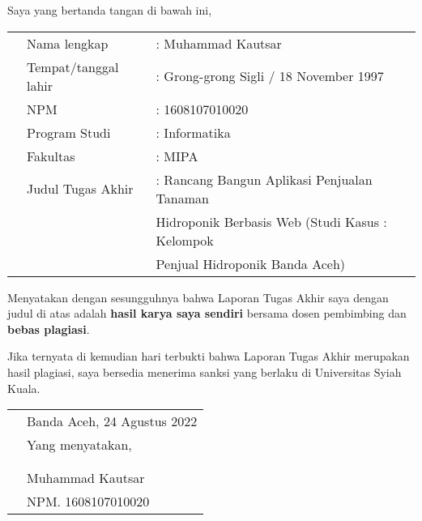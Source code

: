 \bplagiasi %

\noindent
Saya yang bertanda tangan di bawah ini,

\vspace{-0.1cm}

\begin{table}[H]
\begin{tabular}{m{0.6cm}ll}
	&Nama lengkap   		&: Muhammad Kautsar \\
	&Tempat/tanggal lahir	&: Grong-grong Sigli / 18 November 1997 \\
	&NPM       			&: 1608107010020    \\
	&Program Studi   		&: Informatika \\
	&Fakultas 				&: MIPA \\
	&Judul Tugas Akhir     &: Rancang Bangun Aplikasi Penjualan Tanaman\\
	&                       & Hidroponik Berbasis Web (Studi Kasus : Kelompok\\
	&                       & Penjual Hidroponik Banda Aceh)
\end{tabular}
\end{table}

\vspace{0.2cm}
\noindent
Menyatakan dengan sesungguhnya bahwa Laporan Tugas Akhir saya dengan judul di atas adalah \textbf{hasil karya saya sendiri} bersama dosen pembimbing dan \textbf{bebas plagiasi}.

\vspace{1cm}
\noindent
Jika ternyata di kemudian hari terbukti bahwa Laporan Tugas Akhir merupakan hasil plagiasi, saya bersedia menerima sanksi yang berlaku di Universitas Syiah Kuala.

\vspace{1cm}


\begin{tabular}{p{7.5cm}l}
	&Banda Aceh, 24 Agustus 2022\\
	&Yang menyatakan,\\
	&\\
	&\\
	&Muhammad Kautsar\\
	&NPM. 1608107010020
\end{tabular}